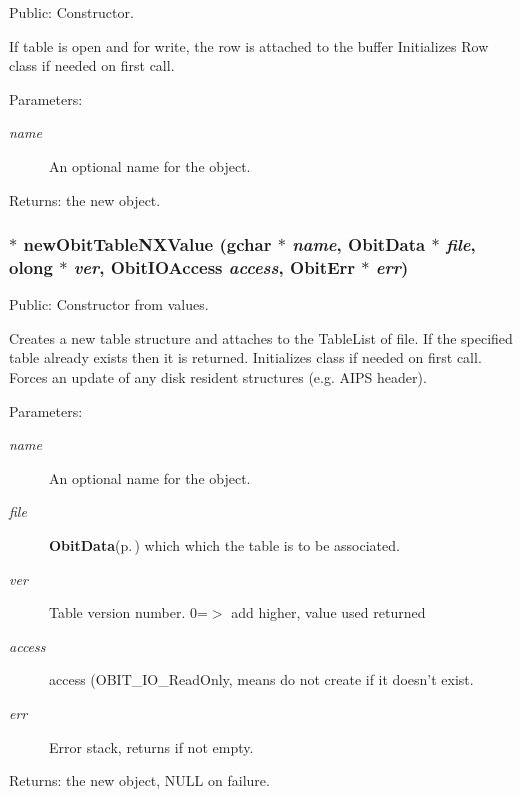 Public: Constructor. 

If table is open and for write, the row is attached to the buffer Initializes Row class if needed on first call. \begin{Desc}
\item[Parameters:]
\begin{description}
\item[{\em name}]An optional name for the object. \end{description}
\end{Desc}
\begin{Desc}
\item[Returns:]the new object. \end{Desc}
\subsubsection{$\ast$ new\-Obit\-Table\-NXValue (gchar $\ast$ {\em name}, {\bf Obit\-Data} $\ast$ {\em file}, {\bf olong} $\ast$ {\em ver}, Obit\-IOAccess {\em access}, {\bf Obit\-Err} $\ast$ {\em err})}\label{ObitTableNX_8h_a12}


Public: Constructor from values. 

Creates a new table structure and attaches to the Table\-List of file. If the specified table already exists then it is returned. Initializes class if needed on first call. Forces an update of any disk resident structures (e.g. AIPS header). \begin{Desc}
\item[Parameters:]
\begin{description}
\item[{\em name}]An optional name for the object. \item[{\em file}]{\bf Obit\-Data}{\rm (p.\,\pageref{structObitData})} which which the table is to be associated. \item[{\em ver}]Table version number. 0=$>$ add higher, value used returned \item[{\em access}]access (OBIT\_\-IO\_\-Read\-Only, means do not create if it doesn't exist. \item[{\em err}]Error stack, returns if not empty. \end{description}
\end{Desc}
\begin{Desc}
\item[Returns:]the new object, NULL on failure. \end{Desc}
